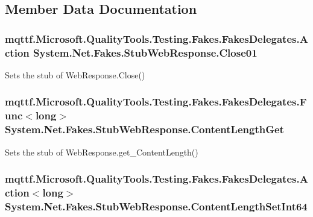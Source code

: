 \subsection{Member Data Documentation}
\hypertarget{class_system_1_1_net_1_1_fakes_1_1_stub_web_response_a09d89116ea87973cf1033fbdf1254168}{
\subsubsection[{Close01}]{\setlength{\rightskip}{0pt plus 5cm}mqttf.\-Microsoft.\-Quality\-Tools.\-Testing.\-Fakes.\-Fakes\-Delegates.\-Action System.\-Net.\-Fakes.\-Stub\-Web\-Response.\-Close01}}\label{class_system_1_1_net_1_1_fakes_1_1_stub_web_response_a09d89116ea87973cf1033fbdf1254168}


Sets the stub of Web\-Response.\-Close()

\hypertarget{class_system_1_1_net_1_1_fakes_1_1_stub_web_response_aacfbc020c292c4fd50a402b7a3588fb4}{
\subsubsection[{Content\-Length\-Get}]{\setlength{\rightskip}{0pt plus 5cm}mqttf.\-Microsoft.\-Quality\-Tools.\-Testing.\-Fakes.\-Fakes\-Delegates.\-Func$<$long$>$ System.\-Net.\-Fakes.\-Stub\-Web\-Response.\-Content\-Length\-Get}}\label{class_system_1_1_net_1_1_fakes_1_1_stub_web_response_aacfbc020c292c4fd50a402b7a3588fb4}


Sets the stub of Web\-Response.\-get\-\_\-\-Content\-Length()

\hypertarget{class_system_1_1_net_1_1_fakes_1_1_stub_web_response_a9485e4bf8db1025d80c59a70841e08aa}{
\subsubsection[{Content\-Length\-Set\-Int64}]{\setlength{\rightskip}{0pt plus 5cm}mqttf.\-Microsoft.\-Quality\-Tools.\-Testing.\-Fakes.\-Fakes\-Delegates.\-Action$<$long$>$ System.\-Net.\-Fakes.\-Stub\-Web\-Response.\-Content\-Length\-Set\-Int64}}\label{class_system_1_1_net_1_1_fakes_1_1_stub_web_response_a9485e4bf8db1025d80c59a70841e08aa}


